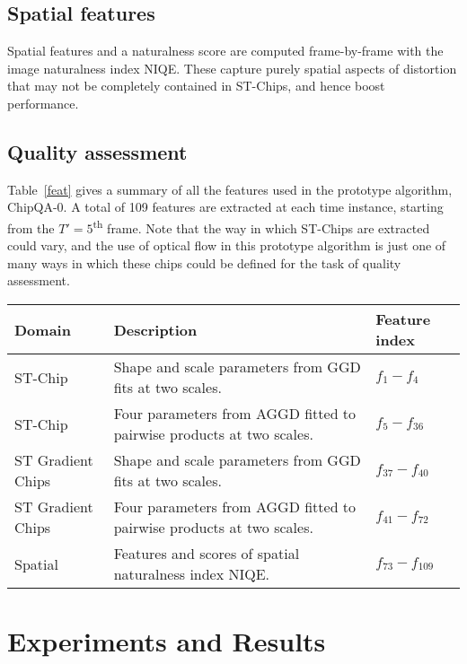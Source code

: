 \documentclass[conference]{IEEEtran}
\begin{document}
\subsection{Spatial features}

Spatial features and a naturalness score are computed frame-by-frame with the image naturalness index NIQE. These capture purely spatial aspects of distortion that may not be completely contained in ST-Chips, and hence boost performance. 

\subsection{Quality assessment}


Table~\ref{feat} gives a summary of all the features used in the prototype algorithm, ChipQA-0. A total of 109 features are extracted at each time instance, starting from the $T'=5$\textsuperscript{th} frame. Note that the way in which ST-Chips are extracted could vary, and the use of optical flow in this prototype algorithm is just one of many ways in which these chips could be defined for the task of quality assessment. 

\begin{table*}
\caption{Descriptions of features in ChipQA.}
\begin{center}
\begin{tabular}{|l|l|l|}
\hline
Domain &  Description & Feature index\\
\hline
ST-Chip &  Shape and scale parameters from GGD fits at two scales. & $f_1-f_4$ \\
\hline
ST-Chip &  Four parameters from AGGD fitted to pairwise products at two scales. & $f_5-f_{36}$ \\
\hline
ST Gradient Chips &  Shape and scale parameters from GGD fits at two scales. & $f_{37}-f_{40}$ \\
\hline
ST Gradient Chips &  Four parameters from AGGD fitted to pairwise products at two scales. & $f_{41}-f_{72}$ \\
\hline
Spatial & Features and scores of spatial naturalness index NIQE. & $f_{73}-f_{109}$ \\
\hline
\end{tabular}
\label{feat}
\end{center}
\end{table*}

\section{Experiments and Results}
\end{document}
